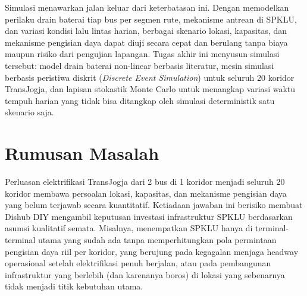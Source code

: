 Simulasi menawarkan jalan keluar dari keterbatasan ini. Dengan memodelkan
perilaku drain baterai tiap bus per segmen rute, mekanisme antrean di SPKLU,
dan variasi kondisi lalu lintas harian, berbagai skenario lokasi, kapasitas,
dan mekanisme pengisian daya dapat diuji secara cepat dan berulang tanpa
biaya maupun risiko dari pengujian lapangan. Tugas akhir ini menyusun
simulasi tersebut: model drain baterai non-linear berbasis literatur,
mesin simulasi berbasis peristiwa diskrit (\textit{Discrete Event Simulation})
untuk seluruh 20 koridor TransJogja, dan lapisan stokastik Monte Carlo untuk
menangkap variasi waktu tempuh harian yang tidak bisa ditangkap oleh simulasi
deterministik satu skenario saja.

\section{Rumusan Masalah}

Perluasan elektrifikasi TransJogja dari 2 bus di 1 koridor menjadi seluruh
20 koridor membawa persoalan lokasi, kapasitas, dan mekanisme pengisian daya
yang belum terjawab secara kuantitatif. Ketiadaan jawaban ini berisiko
membuat Dishub DIY mengambil keputusan investasi infrastruktur SPKLU
berdasarkan asumsi kualitatif semata. Misalnya, menempatkan SPKLU hanya di
terminal-terminal utama yang sudah ada tanpa memperhitungkan pola permintaan
pengisian daya riil per koridor, yang berujung pada kegagalan menjaga
headway operasional setelah elektrifikasi penuh berjalan, atau pada
pembangunan infrastruktur yang berlebih (dan karenanya boros) di lokasi yang
sebenarnya tidak menjadi titik kebutuhan utama.

